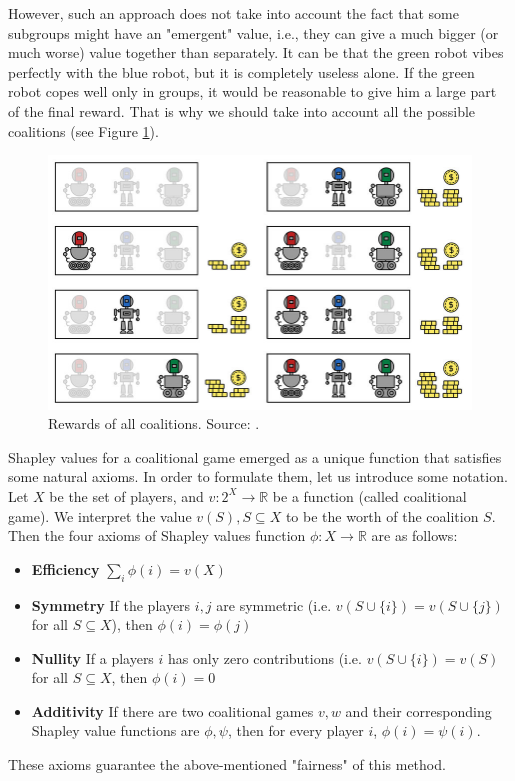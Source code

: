 \documentclass[en]{pracamgr}
\begin{document}
However, such an approach does not take into account the fact that some subgroups might have an "emergent" value, i.e., they can give a much bigger (or much worse) value together than separately. It can be that the green robot vibes perfectly with the blue robot, but it is completely useless alone. If the green robot copes well only in groups, it would be reasonable to give him a large part of the final reward. That is why we should take into account all the possible coalitions (see Figure \ref{rewards_all}).

\begin{figure}[H]
\centering
\includegraphics[scale=0.3]{./images/Shap_all_coal.png}
\caption{Rewards of all coalitions. Source: \cite{DBLP:conf/ijcai/RozemberczkiWBY22}.}
\label{rewards_all}
\end{figure}

Shapley values for a coalitional game emerged as a unique function that satisfies some natural axioms. In order to formulate them, let us introduce some notation.  Let $X$ be the set of players, and $v: 2^X \rightarrow \mathbb{R}$ be a function (called coalitional game). We interpret the value $v(S), S \subseteq X$ to be the worth of the coalition $S$. Then the four axioms of Shapley values function $\phi:X  \rightarrow \mathbb{R}$ are as follows:
\begin{itemize}
\item \textbf{Efficiency}  $\sum_i  \phi(i) = v(X)$
\item \textbf{Symmetry} If the players $i, j$ are symmetric (i.e. $v(S\cup \{i\}) = v(S \cup \{j\})$ for all $S \subseteq X$), then $\phi(i) = \phi(j)$
\item \textbf{Nullity} If a players $i$ has only zero contributions (i.e. $v(S\cup \{i\}) = v(S)$ for all $S \subseteq X$, then $\phi(i) = 0$
\item \textbf{Additivity} If there are two coalitional games $v, w$ and their corresponding Shapley value functions are $\phi, \psi$, then for every player $i$, $\phi(i) = \psi(i)$.
\end{itemize}
These axioms guarantee the above-mentioned "fairness" of this method.
\end{document}
